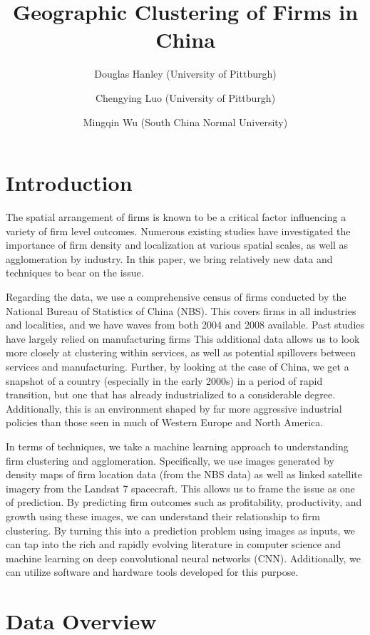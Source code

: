\documentclass[12pt]{article}
\title{Geographic Clustering of Firms in China}
\author{
Douglas Hanley (University of Pittburgh) \and
Chengying Luo (University of Pittburgh) \and
Mingqin Wu (South China Normal University)
}
\begin{document}
\maketitle

\section{Introduction}

The spatial arrangement of firms is known to be a critical factor influencing a variety of firm level outcomes. Numerous existing studies have investigated the importance of firm density and localization at various spatial scales, as well as agglomeration by industry. In this paper, we bring relatively new data and techniques to bear on the issue.

Regarding the data, we use a comprehensive census of firms conducted by the National Bureau of Statistics of China (NBS). This covers firms in all industries and localities, and we have waves from both 2004 and 2008 available. Past studies have largely relied on manufacturing firms This additional data allows us to look more closely at clustering within services, as well as potential spillovers between services and manufacturing. Further, by looking at the case of China, we get a snapshot of a country (especially in the early 2000s) in a period of rapid transition, but one that has already industrialized to a considerable degree. Additionally, this is an environment shaped by far more aggressive industrial policies than those seen in much of Western Europe and North America.

In terms of techniques, we take a machine learning approach to understanding firm clustering and agglomeration. Specifically, we use images generated by density maps of firm location data (from the NBS data) as well as linked satellite imagery from the Landsat 7 spacecraft. This allows us to frame the issue as one of prediction. By predicting firm outcomes such as profitability, productivity, and growth using these images, we can understand their relationship to firm clustering. By turning this into a prediction problem using images as inputs, we can tap into the rich and rapidly evolving literature in computer science and machine learning on deep convolutional neural networks (CNN). Additionally, we can utilize software and hardware tools developed for this purpose.

\section{Data Overview}
\end{document}
